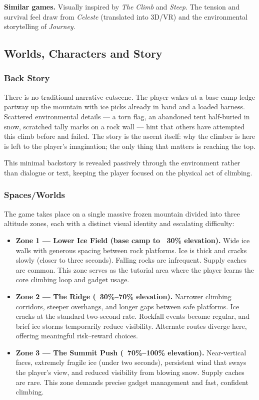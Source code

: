 \documentclass[12pt]{article}
\begin{document}
\textbf{Similar games.} Visually inspired by \textit{The Climb} and \textit{Steep}. The tension and survival feel draw from \textit{Celeste} (translated into 3D/VR) and the environmental storytelling of \textit{Journey}.

\subsection{Worlds, Characters and Story}

\subsubsection{Back Story}

There is no traditional narrative cutscene. The player wakes at a base-camp ledge partway up the mountain with ice picks already in hand and a loaded harness. Scattered environmental details --- a torn flag, an abandoned tent half-buried in snow, scratched tally marks on a rock wall --- hint that others have attempted this climb before and failed. The story is the ascent itself: why the climber is here is left to the player's imagination; the only thing that matters is reaching the top.

This minimal backstory is revealed passively through the environment rather than dialogue or text, keeping the player focused on the physical act of climbing.

\subsubsection{Spaces/Worlds}

The game takes place on a single massive frozen mountain divided into three altitude zones, each with a distinct visual identity and escalating difficulty:

\begin{itemize}[leftmargin=2em]
    \item \textbf{Zone 1 --- Lower Ice Field (base camp to ~30\% elevation).} Wide ice walls with generous spacing between rock platforms. Ice is thick and cracks slowly (closer to three seconds). Falling rocks are infrequent. Supply caches are common. This zone serves as the tutorial area where the player learns the core climbing loop and gadget usage.

    \item \textbf{Zone 2 --- The Ridge (~30\%--70\% elevation).} Narrower climbing corridors, steeper overhangs, and longer gaps between safe platforms. Ice cracks at the standard two-second rate. Rockfall events become regular, and brief ice storms temporarily reduce visibility. Alternate routes diverge here, offering meaningful risk--reward choices.

    \item \textbf{Zone 3 --- The Summit Push (~70\%--100\% elevation).} Near-vertical faces, extremely fragile ice (under two seconds), persistent wind that sways the player's view, and reduced visibility from blowing snow. Supply caches are rare. This zone demands precise gadget management and fast, confident climbing.
\end{itemize}
\end{document}

